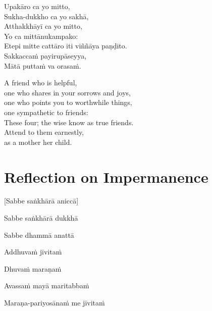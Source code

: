 Upakāro ca yo mitto,\\
Sukha-dukkho ca yo sakhā,\\
Atthakkhāyī ca yo mitto,\\
Yo ca mittānukampako:\\
Etepi mitte cattāro iti viññāya paṇḍito.\\
Sakkaccaṁ payirupāseyya,\\
Mātā puttaṁ va orasaṁ.

\begin{english}
  A friend who is helpful,\\
  one who shares in your sorrows and joys,\\
  one who points you to worthwhile things,\\
  one sympathetic to friends:\\
  These four; the wise know as true friends.\\
  Attend to them earnestly,\\
  as a mother her child.
\end{english}

\section{Reflection on Impermanence}



\begin{leader}
\end{leader}

[Sabbe saṅkhārā aniccā]


Sabbe saṅkhārā dukkhā


Sabbe dhammā anattā


Addhuvaṁ jīvitaṁ


Dhuvaṁ maraṇaṁ


Avassaṁ mayā maritabbaṁ


Maraṇa-pariyosānaṁ me jīvitaṁ

